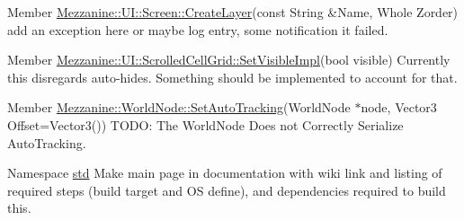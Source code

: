 \begin{DoxyDescription}
\item[Member \hyperlink{classMezzanine_1_1UI_1_1Screen_a4c7471ee8b43649a5eab8c43e28f31b7}{Mezzanine::UI::Screen::CreateLayer}(const String \&Name, Whole Zorder) ]add an exception here or maybe log entry, some notification it failed. 
\end{DoxyDescription}

\label{todo__todo000031}
\hypertarget{todo__todo000031}{}
 
\begin{DoxyDescription}
\item[Member \hyperlink{classMezzanine_1_1UI_1_1ScrolledCellGrid_a259a2f007e7afc5b2fa967c02b0d5627}{Mezzanine::UI::ScrolledCellGrid::SetVisibleImpl}(bool visible) ]Currently this disregards auto-\/hides. Something should be implemented to account for that. 
\end{DoxyDescription}

\label{todo__todo000034}
\hypertarget{todo__todo000034}{}
 
\begin{DoxyDescription}
\item[Member \hyperlink{classMezzanine_1_1WorldNode_accb11fd94c98482d5d1b28894a1f4d9b}{Mezzanine::WorldNode::SetAutoTracking}(WorldNode $\ast$node, Vector3 Offset=Vector3()) ]TODO: The WorldNode Does not Correctly Serialize AutoTracking. 
\end{DoxyDescription}

\label{todo__todo000009}
\hypertarget{todo__todo000009}{}
 
\begin{DoxyDescription}
\item[Namespace \hyperlink{namespacestd}{std} ]Make main page in documentation with wiki link and listing of required steps (build target and OS define), and dependencies required to build this. 
\end{DoxyDescription}